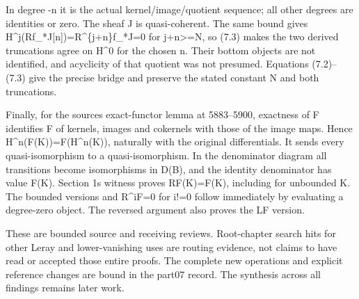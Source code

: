 In degree -n it is the actual kernel/\allowbreak{}image/\allowbreak{}quotient sequence; all other degrees are identities or zero. The sheaf J is quasi-coherent. The same bound gives H\textasciicircum{}j(Rf\_\allowbreak{}*J[n]\allowbreak{})\allowbreak{}\allowbreak{}=R\textasciicircum{}\{j\allowbreak{}+n\}f\_\allowbreak{}*J\allowbreak{}=0 for j\allowbreak{}+n>\allowbreak{}=N,\allowbreak{} so (7.3)\allowbreak{} makes the two derived truncations agree on H\^{}0 for the chosen n. Their bottom objects are not identified,\allowbreak{} and acyclicity of that quotient was not presumed. Equations (7.2)\allowbreak{}–\allowbreak{}(7.3)\allowbreak{} give the precise bridge and preserve the stated constant N and both truncations.

Finally,\allowbreak{} for the source\textquotesingle s exact-functor lemma at 5883–\allowbreak{}5900,\allowbreak{} exactness of F identifies F of kernels,\allowbreak{} images and cokernels with those of the image maps. Hence H\textasciicircum{}n(F(K)\allowbreak{})\allowbreak{}\allowbreak{}=F(H\textasciicircum{}n(K)\allowbreak{})\allowbreak{},\allowbreak{} naturally with the original differentials. It sends every quasi-isomorphism to a quasi-isomorphism. In the denominator diagram all transitions become isomorphisms in D(B)\allowbreak{},\allowbreak{} and the identity denominator has value F(K)\allowbreak{}. Section 1\textquotesingle s witness proves RF(K)\allowbreak{}\allowbreak{}=F(K)\allowbreak{},\allowbreak{} including for unbounded K. The bounded versions and R\textasciicircum{}iF\allowbreak{}=0 for i!\allowbreak{}=0 follow immediately by evaluating a degree-zero object. The reversed argument also proves the LF version.

These are bounded source and receiving reviews. Root-chapter search hits for other Leray and lower-vanishing uses are routing evidence,\allowbreak{} not claims to have read or accepted those entire proofs. The complete new operations and explicit reference changes are bound in the part07 record. The synthesis across all findings remains later work.
